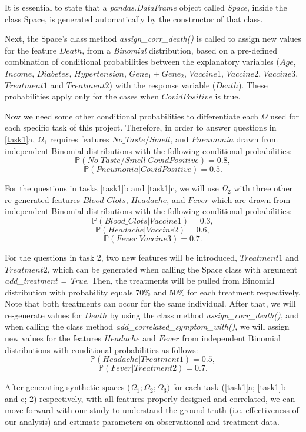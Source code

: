 It is essential to state that a \textit{pandas.DataFrame} object called \textit{Space}, inside the class Space, is generated automatically by the constructor of that class.

Next, the Space's class method \textit{assign\_corr\_death()} is called to assign new values for the feature $Death$, from a \textit{Binomial} distribution, based on a pre-defined combination of conditional probabilities between the explanatory variables ($Age$, $Income$, $Diabetes$, $Hypertension$, $Gene_1+Gene_2$, $Vaccine1$, $Vaccine2$, $Vaccine3$, $Treatment1$ and $Treatment2$) with the response variable ($Death$). These probabilities apply only for the cases when $CovidPositive$ is true.

Now we need some other conditional probabilities to differentiate each $\Omega$ used for each specific task of this project. Therefore, in order to answer questions in \ref{task1}a, $\Omega_1$ requires features $No\_Taste/Smell$, and $Pneumonia$ drawn from independent Binomial distributions with the following conditional probabilities: $$\mathbb{P}(No\_Taste/Smell | CovidPositive)=0.8,$$ $$\mathbb{P}(Pneumonia | CovidPositive)=0.5.$$

For the questions in tasks \ref{task1}b and \ref{task1}c, we will use $\Omega_2$ with three other re-generated features $Blood\_Clots$, $Headache$, and $Fever$ which are drawn from independent Binomial distributions with the following conditional probabilities: $$\mathbb{P}(Blood\_Clots| Vaccine 1) = 0.3,$$ $$\mathbb{P}(Headache | Vaccine 2) = 0.6,$$ $$\mathbb{P}(Fever | Vaccine 3) = 0.7.$$

For the questions in task 2, two new features will be introduced, $Treatment 1$ and $Treatment 2$, which can be generated when calling the Space class with argument \textit{add\_treatment = True}. Then, the treatments will be pulled from Binomial distribution with probability equals 70\% and 50\% for each treatment respectively. Note that both treatments can occur for the same individual. After that, we will re-generate values for $Death$ by using the class method \textit{assign\_corr\_death()}, and when calling the class method \textit{add\_correlated\_symptom\_with()}, we will assign new values for the features $Headache$ and $Fever$ from independent Binomial distributions with conditional probabilities as follows: $$\mathbb{P}(Headache | Treatment 1) = 0.5,$$ $$\mathbb{P}(Fever | Treatment 2) = 0.7.$$

After generating synthetic spaces ($\Omega_1; \Omega_2; \Omega_3)$ for each task (\ref{task1}a; \ref{task1}b and c; 2) respectively, with all features properly designed and correlated, we can move forward with our study to understand the ground truth (i.e. effectiveness of our analysis) and estimate parameters on observational and treatment data.
